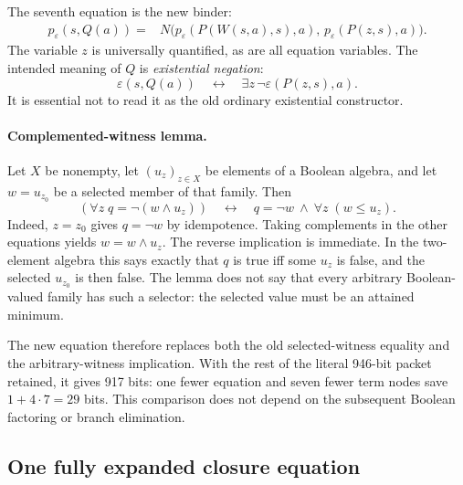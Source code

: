 The seventh equation is the new binder:
\begin{equation}
\begin{split}
 p_\varepsilon(s,Q(a))={}&N\bigl(
      p_\varepsilon(P(W(s,a),s),a),\,
      p_\varepsilon(P(z,s),a)\bigr).
\end{split}
\label{eq:e713-quantifier}
\end{equation}
The variable $z$ is universally quantified, as are all equation variables.
The intended meaning of $Q$ is \emph{existential negation}:
\[
 \varepsilon(s,Q(a))\quad\longleftrightarrow\quad
      \exists z\,\neg\varepsilon(P(z,s),a).
\]
It is essential not to read it as the old ordinary existential constructor.

\paragraph{Complemented-witness lemma.}
Let $X$ be nonempty, let $(u_z)_{z\in X}$ be elements of a Boolean algebra,
and let $w=u_{z_0}$ be a selected member of that family. Then
\[
 (\forall z\;q=\neg(w\wedge u_z))
 \quad\longleftrightarrow\quad
 q=\neg w\ \land\ \forall z\;(w\leq u_z).
\]
Indeed, $z=z_0$ gives $q=\neg w$ by idempotence. Taking complements in
the other equations yields $w=w\wedge u_z$. The reverse implication
is immediate. In the two-element algebra this says exactly that $q$ is
true iff some $u_z$ is false, and the selected $u_{z_0}$ is then false.
The lemma does not say that every arbitrary Boolean-valued family has
such a selector: the selected value must be an attained minimum.

The new equation therefore replaces both the old selected-witness equality
and the arbitrary-witness implication. With the rest of the literal
946-bit packet retained, it gives 917 bits: one fewer equation and seven
fewer term nodes save $1+4\cdot7=29$ bits. This comparison does not depend
on the subsequent Boolean factoring or branch elimination.

\subsection{One fully expanded closure equation}

